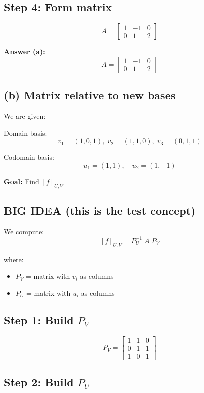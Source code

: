 \documentclass[11pt]{article}
\begin{document}
\subsection*{Step 4: Form matrix}

\[
A =
\begin{bmatrix}
1 & -1 & 0 \\
0 & 1 & 2
\end{bmatrix}
\]

\textbf{Answer (a):}
\[
A =
\begin{bmatrix}
1 & -1 & 0 \\
0 & 1 & 2
\end{bmatrix}
\]

\hrulefill

\subsection*{(b) Matrix relative to new bases}

We are given:

Domain basis:
\[
v_1 = (1,0,1),\;
v_2 = (1,1,0),\;
v_3 = (0,1,1)
\]

Codomain basis:
\[
u_1 = (1,1),\quad u_2 = (1,-1)
\]

\textbf{Goal:}
Find $[f]_{U,V}$

\subsection*{BIG IDEA (this is the test concept)}

We compute:
\[
[f]_{U,V} = P_U^{-1} \; A \; P_V
\]

where:
\begin{itemize}
    \item $P_V$ = matrix with $v_i$ as columns
    \item $P_U$ = matrix with $u_i$ as columns
\end{itemize}

\hrulefill

\subsection*{Step 1: Build $P_V$}

\[
P_V =
\begin{bmatrix}
1 & 1 & 0 \\
0 & 1 & 1 \\
1 & 0 & 1
\end{bmatrix}
\]

\subsection*{Step 2: Build $P_U$}
\end{document}
